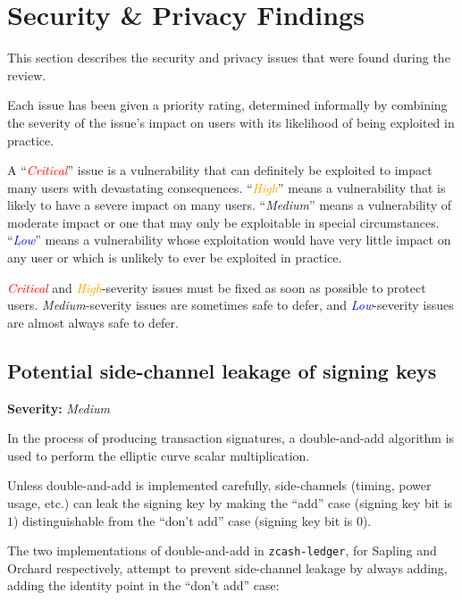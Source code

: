 \documentclass[10pt,titlepage]{article}
\newcommand{\CriticalIssue}{\textcolor{red}{\emph{Critical}}}
\newcommand{\HighIssue}{\textcolor{orange}{\emph{High}}}
\newcommand{\MediumIssue}{\textcolor{darkyellow}{\emph{Medium}}}
\newcommand{\LowIssue}{\textcolor{blue}{\emph{Low}}}
\begin{document}
\section{Security \& Privacy Findings} \label{secfindings}
\renewcommand{\thesubsection}{Issue \Alph{subsection}}

This section describes the security and privacy issues that were found during
the review.

Each issue has been given a priority rating, determined informally by combining
the severity of the issue's impact on users with its likelihood of being
exploited in practice.

A ``\CriticalIssue'' issue is a vulnerability
that can definitely be exploited to impact many users with devastating
consequences.  ``\HighIssue'' means a vulnerability that
is likely to have a severe impact on many users.
``\MediumIssue'' means a vulnerability of moderate impact
or one that may only be exploitable in special circumstances.
``\LowIssue'' means a vulnerability whose exploitation would
have very little impact on any user or which is unlikely to ever be exploited in
practice.

\CriticalIssue{} and \HighIssue{}-severity issues must be fixed as soon as
possible to protect users.  \MediumIssue{}-severity issues are sometimes safe to
defer, and \LowIssue{}-severity issues are almost always safe to defer.

\subsection{Potential side-channel leakage of signing keys} \label{issuesidechannels}
\textbf{Severity:} \MediumIssue

In the process of producing transaction signatures, a double-and-add algorithm
is used to perform the elliptic curve scalar multiplication. 

Unless double-and-add is implemented carefully, side-channels (timing, power
usage, etc.) can leak the signing key by making the ``add'' case (signing key
bit is $1$) distinguishable from the ``don't add'' case (signing key bit is
$0$).

The two implementations of double-and-add in \texttt{zcash-ledger}, for Sapling
and Orchard respectively, attempt to prevent side-channel leakage by always
adding, adding the identity point in the ``don't add'' case:
\end{document}
